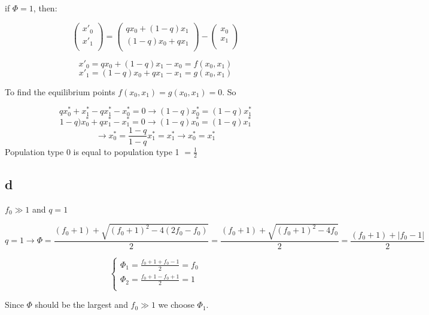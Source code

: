 if $\varPhi = 1$, then:

\[ \begin{pmatrix}
         x'_0\\
         x'_1\\
       \end{pmatrix} = \begin{pmatrix}
                qx_0 + (1-q)x_1\\
                (1-q)x_0+qx_1\\
              \end{pmatrix} - \begin{pmatrix}
                       x_0\\
                       x_1\\
                     \end{pmatrix} \]
                     
                     
\[  x'_0 = qx_0 + (1-q)x_1 -x_0 = f(x_{0}, x_1)\]
\[  x'_1 = (1-q)x_0+qx_1-x_1 = g(x_0,x_1)\]


To find the equilibrium points $f(x_0,x_1) = g(x_0, x_1) = 0$. So

\[ qx^*_0 + x^*_1 -qx^*_1 - x^*_0 = 0 \rightarrow (1-q)x^*_0 = (1-q)x^*_1\]
\[ 1-q)x^*_0+qx^*_1-x^*_1 = 0 \rightarrow (1-q)x^*_0 = (1-q)x^*_1\]
\[ \rightarrow x^*_0 = \frac{1-q}{1-q}x^*_1 = x^*_1 \rightarrow x^*_0 = x^*_1\]
Population type 0 is equal to population type 1 $= \frac{1}{2}$

\subsection{d}

$f_0 \gg 1$ and $q=1$

\[q=1 \rightarrow \varPhi =  \frac{(f_0+1) + \sqrt{(f_0+1)^2 -4(2f_0-f_0)}}{2} = \frac{(f_0+1)+\sqrt{(f_0+1)^2-4f_0}}{2} = \frac{(f_0+1) + |f_0-1|}{2} \]

\[ \left\{ \begin{array}{l}
         \varPhi_1 = \frac{f_0+1+f_0 -1}{2} = f_0\\
         \varPhi_2 =\frac{f_0+1-f_0+1}{2} = 1 \\
       \end{array} \right. \] 
       
Since $\varPhi$ should be the largest and $f_0 \gg 1 $ we choose $\varPhi_1$.

